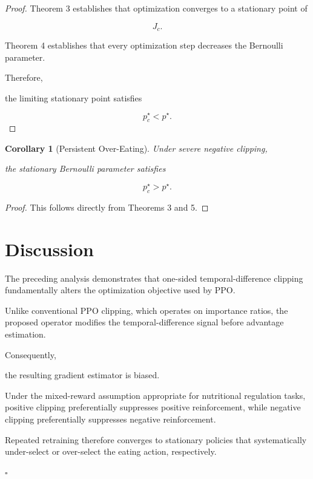 \documentclass[11pt]{article}
\newtheorem{corollary}{Corollary}
\begin{document}
\begin{proof}

Theorem 3 establishes that optimization converges to a stationary
point of

\[
J_c.
\]

Theorem 4 establishes that every optimization step decreases
the Bernoulli parameter.

Therefore,

the limiting stationary point satisfies

\[
p^\star_c
<
p^\star.
\]

\end{proof}


\begin{corollary}[Persistent Over-Eating]

Under severe negative clipping,

the stationary Bernoulli parameter satisfies

\[
p^\star_c
>
p^\star.
\]

\end{corollary}

\begin{proof}

This follows directly from Theorems 3 and 5.

\end{proof}


\section{Discussion}

The preceding analysis demonstrates that one-sided temporal-difference
clipping fundamentally alters the optimization objective used by PPO.

Unlike conventional PPO clipping, which operates on importance ratios,
the proposed operator modifies the temporal-difference signal before
advantage estimation.

Consequently,

the resulting gradient estimator is biased.

Under the mixed-reward assumption appropriate for nutritional
regulation tasks, positive clipping preferentially suppresses
positive reinforcement, while negative clipping preferentially
suppresses negative reinforcement.

Repeated retraining therefore converges to stationary policies that
systematically under-select or over-select the eating action,
respectively.

\hfill$\square$
\end{document}
